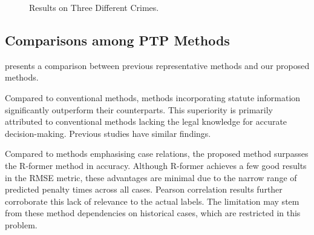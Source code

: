 \begin{figure}[th]
\vfill
\hspace{0.001\linewidth}
\hspace{0.001\linewidth}
\hspace{0.001\linewidth}
    \vspace{-1em}
\caption{Results on Three Different Crimes.}
\label{fig:over}
\vspace{-1.5em}
\end{figure}

\subsection{Comparisons among PTP Methods}

 presents a comparison between previous representative methods and our proposed methods. 

Compared to conventional methods, methods incorporating statute information significantly outperform their counterparts. This superiority is primarily attributed to conventional methods lacking the legal knowledge for accurate decision-making. Previous studies have similar findings.

Compared to methods emphasising case relations, the proposed method surpasses the R-former method in accuracy. Although R-former achieves a few good results in the RMSE metric, these advantages are minimal due to the narrow range of predicted penalty times across all cases. Pearson correlation results further corroborate this lack of relevance to the actual labels. The limitation may stem from these method dependencies on historical cases, which are restricted in this problem.

